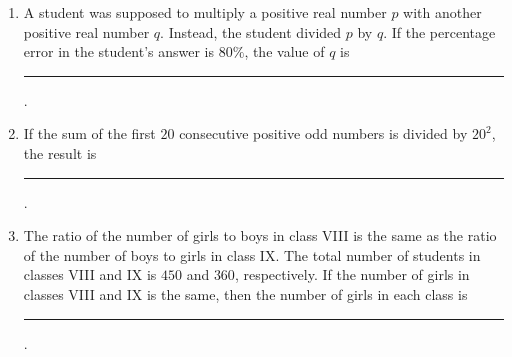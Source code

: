 \documentclass[journal,12pt,onecolumn]{IEEEtran}
\theoremstyle{remark}
\begin{document}
\begin{enumerate}
\item A student was supposed to multiply a positive real number $p$ with another positive real number $q$. Instead, the student divided $p$ by $q$. If the percentage error in the student's answer is $80\%$, the value of $q$ is \rule{3cm}{0.15mm}. \hfill{}
\begin{enumerate}
\end{enumerate}

\item If the sum of the first $20$ consecutive positive odd numbers is divided by $20^{2}$, the result is \rule{3cm}{0.15mm}. \hfill{}
\begin{enumerate}
\end{enumerate}

\item The ratio of the number of girls to boys in class VIII is the same as the ratio of the number of boys to girls in class IX. The total number of students  in classes VIII and IX is $450$ and $360$, respectively. If the number of girls in classes VIII and IX is the same, then the number of girls in each class is \rule{3cm}{0.15mm}. \hfill{}
\begin{enumerate}
\end{enumerate}


\end{enumerate}
\end{document}

